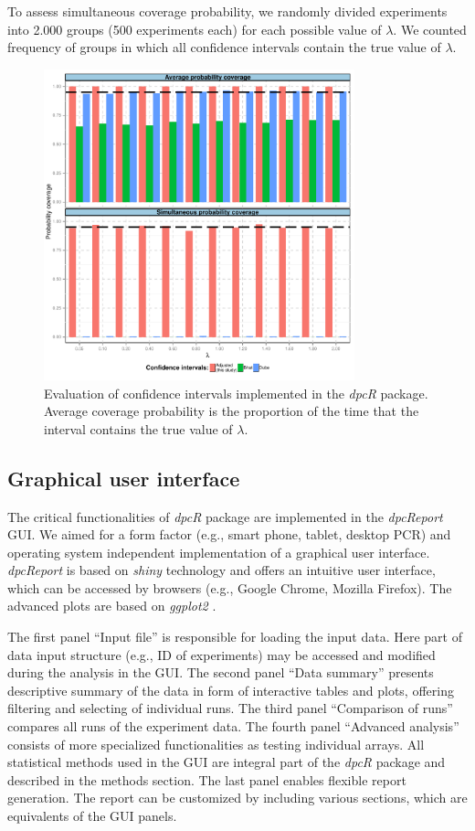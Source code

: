 \documentclass[a4,center,fleqn]{NAR}
\begin{document}
To assess simultaneous coverage probability, we randomly divided experiments 
into 2.000 groups (500 experiments each) for each possible value of $\lambda$. We 
counted frequency of groups in which all confidence intervals contain the true 
value of $\lambda$.

\begin{figure}[t]
\begin{center}
\includegraphics[width=9cm]{coverage.pdf}
\end{center}
\caption{Evaluation of confidence intervals implemented in the \textit{dpcR} 
package. Average coverage probability is the proportion of the time that the 
interval contains the true value of $\lambda$.}
\label{coverage}
\end{figure}

\subsection{Graphical user interface}

The critical functionalities of \textit{dpcR} package are implemented in the 
\textit{dpcReport} GUI. We aimed for a form factor (e.g., smart phone, tablet, 
desktop PCR) and operating system independent implementation of a graphical user 
interface. \textit{dpcReport} is based on \textit{shiny} technology and offers 
an intuitive user interface, which can be accessed by browsers (e.g., Google 
Chrome, Mozilla Firefox). The advanced plots are based on \textit{ggplot2} 
\cite{Wickham_2009}.

The first panel ``Input file'' is responsible for loading the input data. Here 
part of data input structure (e.g., ID of experiments) may be accessed and 
modified during the analysis in the GUI. The second panel ``Data summary'' 
presents descriptive summary of the data in form of interactive tables and 
plots, offering filtering and selecting of individual runs. The third panel 
``Comparison of runs'' compares all runs of the experiment data. The fourth 
panel ``Advanced analysis'' consists of more specialized functionalities as 
testing individual arrays. All statistical methods used in the GUI are integral 
part of the \textit{dpcR} package and described in the methods section. The last 
panel enables flexible report generation. The report can be customized by 
including various sections, which are equivalents of the GUI panels.
\end{document}
